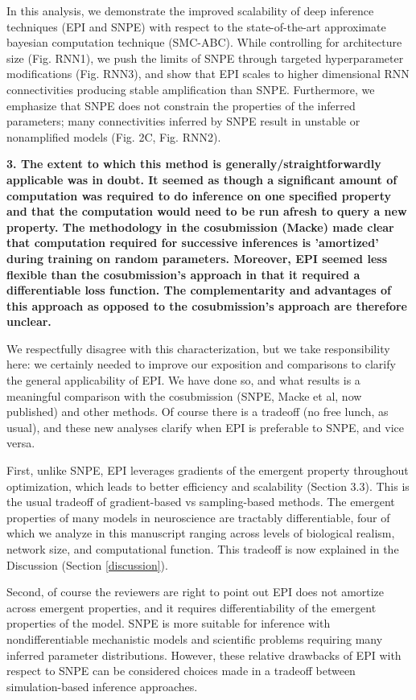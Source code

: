 \documentclass[11pt,a4paper]{article}
\begin{document}
In this analysis, we demonstrate the improved scalability of deep inference techniques (EPI and SNPE) with respect to the state-of-the-art approximate bayesian computation technique (SMC-ABC).
While controlling for architecture size (Fig. RNN1), we push the limits of SNPE through targeted hyperparameter modifications (Fig. RNN3), and show that EPI scales to higher dimensional RNN connectivities producing stable amplification than SNPE.
Furthermore, we emphasize that SNPE does not constrain the properties of the inferred parameters; many connectivities inferred by SNPE result in unstable or nonamplified models (Fig. 2C, Fig. RNN2).

\textbf{3. The extent to which this method is generally/straightforwardly applicable was in doubt. It seemed as though a significant amount of computation was required to do inference on one specified property and that the computation would need to be run afresh to query a new property. The methodology in the cosubmission (Macke) made clear that computation required for successive inferences is 'amortized' during training on random parameters. Moreover, EPI seemed less flexible than the cosubmission's approach in that it required a differentiable loss function. The complementarity and advantages of this approach as opposed to the cosubmission's approach are therefore unclear. } 

We respectfully disagree with this characterization, but we take responsibility here: we certainly needed to improve our exposition and comparisons to clarify the general applicability of EPI.  We have done so, and what results is a meaningful comparison with the cosubmission (SNPE, Macke et al, now published) and other methods.  Of course there is a tradeoff (no free lunch, as usual), and these new analyses clarify when EPI is preferable to SNPE, and vice versa.  

First, unlike SNPE, EPI leverages gradients of the emergent property throughout optimization, which leads to better efficiency and scalability (Section 3.3).   This is the usual tradeoff of gradient-based vs sampling-based methods.  The emergent properties of many models in neuroscience are tractably differentiable, four of which we analyze in this manuscript ranging across levels of biological realism, network size, and computational function. This tradeoff is now explained in the Discussion (Section \ref{discussion}).

Second, of course the reviewers are right to point out EPI does not amortize across emergent properties, and it requires differentiability of the emergent properties of the model.  SNPE is more suitable for inference with nondifferentiable mechanistic models and scientific problems requiring many inferred parameter distributions.  
However, these relative drawbacks of EPI with respect to SNPE can be considered choices made in a tradeoff between simulation-based inference approaches.  
\end{document}
